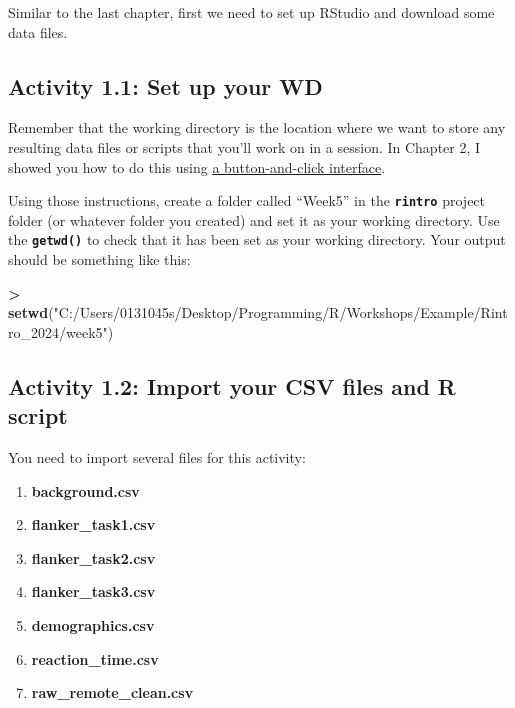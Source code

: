 \documentclass[
]{book}
\newenvironment{Shaded}{\begin{snugshade}}{\end{snugshade}}
\newcommand{\FunctionTok}[1]{\textcolor[rgb]{0.13,0.29,0.53}{\textbf{#1}}}
\newcommand{\NormalTok}[1]{#1}
\newcommand{\SpecialCharTok}[1]{\textcolor[rgb]{0.81,0.36,0.00}{\textbf{#1}}}
\newcommand{\StringTok}[1]{\textcolor[rgb]{0.31,0.60,0.02}{#1}}
\begin{document}
Similar to the last chapter, first we need to set up RStudio and download some data files.

\hypertarget{activity-1.1-set-up-your-wd-1}{%
\subsection{Activity 1.1: Set up your WD}\label{activity-1.1-set-up-your-wd-1}}

Remember that the working directory is the location where we want to store any resulting data files or scripts that you'll work on in a session. In Chapter 2, I showed you how to do this using \protect\hyperlink{set_wd}{a button-and-click interface}.

Using those instructions, create a folder called ``Week5'' in the \textbf{\texttt{rintro}} project folder (or whatever folder you created) and set it as your working directory. Use the \textbf{\texttt{getwd()}} to check that it has been set as your working directory. Your output should be something like this:

\begin{Shaded}
\begin{Highlighting}[]
\SpecialCharTok{\textgreater{}} \FunctionTok{setwd}\NormalTok{(}\StringTok{"C:/Users/0131045s/Desktop/Programming/R/Workshops/Example/Rintro\_2024/week5"}\NormalTok{)}
\end{Highlighting}
\end{Shaded}

\hypertarget{activity-1.2-import-your-csv-files-and-r-script-1}{%
\subsection{Activity 1.2: Import your CSV files and R script}\label{activity-1.2-import-your-csv-files-and-r-script-1}}

You need to import several files for this activity:

\begin{enumerate}
\def\labelenumi{\arabic{enumi}.}
\item
  \textbf{background.csv}
\item
  \textbf{flanker\_task1.csv}
\item
  \textbf{flanker\_task2.csv}
\item
  \textbf{flanker\_task3.csv}
\item
  \textbf{demographics.csv}
\item
  \textbf{reaction\_time.csv}
\item
  \textbf{raw\_remote\_clean.csv}
\end{enumerate}
\end{document}
